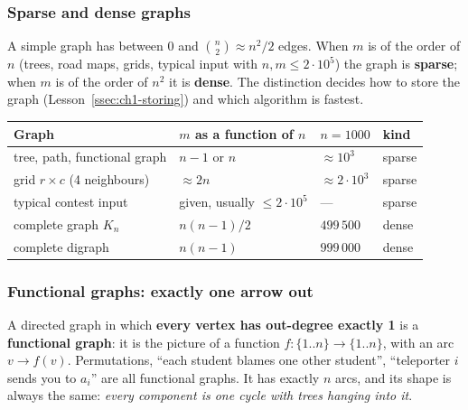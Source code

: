 \subsubsection*{Sparse and dense graphs}

A simple graph has between $0$ and $\binom n2\approx n^2/2$ edges. When $m$ is of the order of $n$ (trees, road maps, grids, typical input with $n,m\le 2\cdot10^5$) the graph is \textbf{sparse}; when $m$ is of the order of $n^2$ it is \textbf{dense}. The distinction decides how to store the graph (Lesson~\ref{ssec:ch1-storing}) and which algorithm is fastest.

\begin{table}[H]
\centering\small
\begin{tabular}{@{}l l l l@{}}
\toprule
\textbf{Graph} & \textbf{$m$ as a function of $n$} & \textbf{$n=1000$} & \textbf{kind} \\
\midrule
tree, path, functional graph & $n-1$ or $n$ & $\approx 10^3$ & sparse \\
grid $r\times c$ (4 neighbours) & $\approx 2n$ & $\approx 2\cdot 10^3$ & sparse \\
typical contest input & given, usually $\le 2\cdot 10^5$ & --- & sparse \\
complete graph $K_n$ & $n(n-1)/2$ & $499\,500$ & dense \\
complete digraph & $n(n-1)$ & $999\,000$ & dense \\
\bottomrule
\end{tabular}
\end{table}

\subsubsection*{Functional graphs: exactly one arrow out}

A directed graph in which \textbf{every vertex has out-degree exactly 1} is a \textbf{functional graph}: it is the picture of a function $f:\{1..n\}\to\{1..n\}$, with an arc $v\to f(v)$. Permutations, ``each student blames one other student'', ``teleporter $i$ sends you to $a_i$'' are all functional graphs. It has exactly $n$ arcs, and its shape is always the same: \emph{every component is one cycle with trees hanging into it}.

